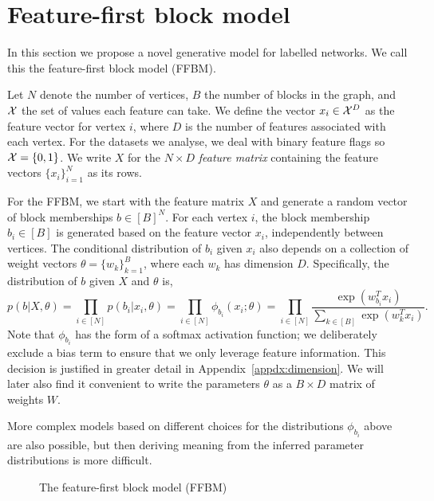 \section{Feature-first block model}

In this section we propose a novel generative model for labelled networks. We call this the feature-first block model (FFBM).

Let $N$ denote the number of vertices, $B$ the number of blocks in the graph,
and ${\cal X}$ the set of values each feature can take.
We define the vector $x_i \in \mathcal{X}^D$ as the feature vector for vertex $i$, 
where $D$ is the number of features associated with each vertex.
For the datasets we analyse, we deal with binary feature flags so $\mathcal{X} = \{0, 1\}$. We write $X$ for the $N\times D$ {\em feature matrix} containing
the feature vectors $\{x_i\}_{i=1}^{N}$ 
as its rows.

For the FFBM, we start with the feature matrix $X$ and generate a random
vector of block memberships $b \in [B]^N$. For each vertex $i$, the
block membership $b_i\in[B]$ is generated based on the feature
vector $x_i$, independently between vertices. The conditional
distribution of $b_i$ given $x_i$ also depends on a collection
of weight vectors $\theta=\{w_k\}_{k=1}^B$, where each
$w_k$ has dimension $D$. Specifically, 
the distribution of $b$ given $X$ and $\theta$ is,
%
\begin{equation}
	p(b| X, \theta) = \prod_{i \in [N]} p(b_i | x_i, \theta) = \prod_{i \in [N]} \phi_{b_i} (x_i; \theta)
	= \prod_{i \in [N]} \frac{\exp\left(w_{b_i}^T x_i\right)}{\sum_{k \in [B]} \exp \left( w_k^T x_i\right)}.
\end{equation}
%
Note that $\phi_{b_i}$ has the form of a softmax activation function;
we deliberately exclude a bias term to ensure that we only leverage feature information.
This decision is justified in greater detail in Appendix~\ref{appdx:dimension}.
We will later also find it convenient
to write the parameters $\theta$ as a $B \times D$ matrix of weights $W$.

More complex models based on different choices for the distributions
$\phi_{b_i}$ above are also possible, but then deriving meaning from 
the inferred parameter distributions is more difficult. 

\begin{figure}[!h]
	\centering
	\caption{The feature-first block model (FFBM)}
	\label{fig:ffbm}
\end{figure}

